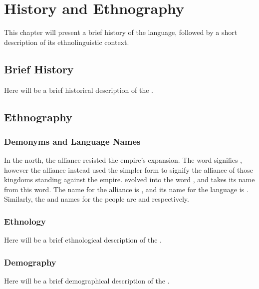\chapter{History and Ethnography}
\label{cha:rdk-ethnography}

This chapter will present a brief history of the \langrdk{} language, followed by a short description of its ethnolinguistic context.

\section{Brief History}
\label{sec:rdk-history}

Here will be a brief historical description of the \peoprdk.

\section{Ethnography}
\label{sec:rdk-ethnography}

\subsection{Demonyms and Language Names}
\label{subsec:rdk-demonyms}

In the north, the alliance resisted the empire's expansion. The \langtvk{} word   signifies , however the alliance instead used the simpler form    to signify the alliance of those kingdoms standing against the empire.  evolved into the \langrdk{} word  , and \fw{\nlangrdk}   takes its name from this word. The \langank{} name for the alliance is  , and its name for the \langrdk{} language is  . Similarly, the \langrdk{} and \langank{} names for the \langrdk{} people are \fw{\npeoprdk}  and   respectively.

\subsection{Ethnology}
\label{subsec:rdk-ethnology}

Here will be a brief ethnological description of the \peoprdk.

\subsection{Demography}
\label{subsec:rdk-demography}

Here will be a brief demographical description of the \peoprdk.